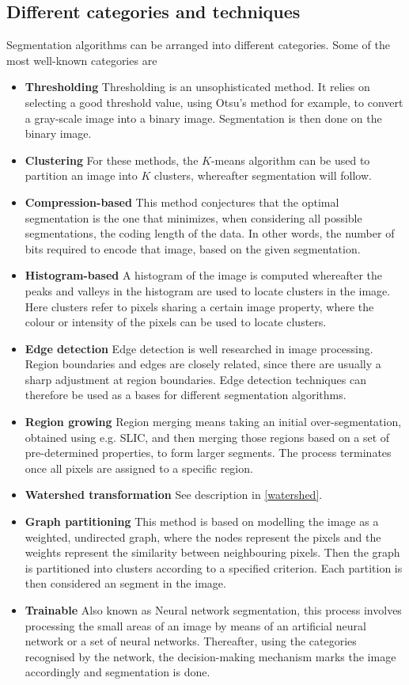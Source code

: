 \documentclass[a4paper,10pt]{article}
\begin{document}
\subsection{Different categories and techniques}
Segmentation algorithms can be arranged into different categories. 
Some of the most well-known categories are
\begin{itemize}
 \item \textbf{Thresholding}\cite{threshold}  Thresholding is an unsophisticated method. It
relies on
     selecting a good threshold
     value, using Otsu's method for example, to convert a gray-scale image into
a binary image.  Segmentation is
     then done on the binary image. 
 \item \textbf{Clustering} For these methods, the $K$-means algorithm
can be used to partition an image into $K$ clusters, whereafter
segmentation will follow.
 \item \textbf{Compression-based}\cite{compression} This method conjectures that the
optimal segmentation is the one that minimizes, when considering all possible
segmentations, the coding length of the data. In other words, the number of bits
required to encode that image, based on the given segmentation.
 \item \textbf{Histogram-based}\cite{threshold}  A histogram of 
the image is computed whereafter the peaks and valleys in the histogram
are used to locate clusters in the image.  Here clusters refer to pixels
sharing a certain image property, where the colour or intensity of the pixels can be used
to
locate clusters.
 \item \textbf{Edge detection}\cite{edge} Edge detection is well researched in image
processing.  Region boundaries and edges are closely related,
since there are usually a sharp adjustment at region boundaries.  Edge detection
techniques can therefore be used as a bases for different segmentation
algorithms.
 \item \textbf{Region growing}\cite{threshold} Region merging means taking an initial over-segmentation,
obtained using e.g. SLIC, and then merging those regions based on a set of
pre-determined properties, to form larger segments.  The process
terminates once all pixels are assigned to a specific region.  
 \item \textbf{Watershed transformation} See description in \ref{watershed}.    
 \item \textbf{Graph partitioning}\cite{rw} This method is based on modelling
the image as a weighted, undirected graph, where the nodes represent the pixels
and the weights represent the similarity between neighbouring pixels. Then the
graph is partitioned into clusters according to a specified criterion.  Each
partition is then considered an segment in the image.
 \item \textbf{Trainable}\cite{trainable} Also known as Neural network segmentation,
this process involves processing the small areas of an image by means of an
artificial neural network or a set of neural networks.  Thereafter, using the
categories recognised by the network, the decision-making mechanism marks the
image accordingly and segmentation is done.
\end{itemize}
\end{document}
